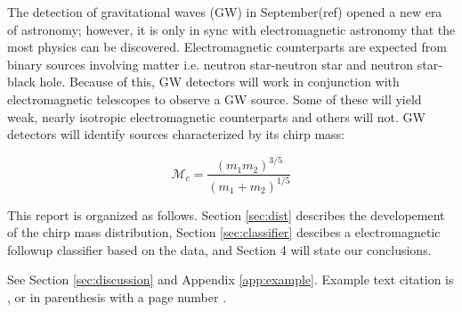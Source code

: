 The detection of gravitational waves (GW) in September(ref) opened a new era of astronomy; however, it is only in sync with electromagnetic astronomy that the most physics can be discovered. Electromagnetic counterparts are expected from binary sources involving matter i.e. neutron star-neutron star and neutron star-black hole. Because of this, GW detectors will work in conjunction with electromagnetic telescopes to observe a GW source. Some of these will yield weak, nearly isotropic electromagnetic counterparts and others will not. GW detectors will identify sources characterized by its chirp mass:

\begin{equation}
\label{chirp_mass}
\mathcal{M}_c=\frac{(m_{1}m_{2})^{3/5}}{(m_{1}+m_{2})^{1/5}}
\end{equation}

This report is organized as follows. Section \ref{sec:dist} describes the developement of the chirp mass distribution, Section \ref{sec:classifier} descibes a electromagnetic followup classifier based on the data, and Section 4 will state our conclusions.

See Section \ref{sec:discussion} and Appendix \ref{app:example}. Example text citation is \textcite{2012ApJ...759...52D}, or in parenthesis with a page number \parencite[pg 2]{2012ApJ...759...52D}.

